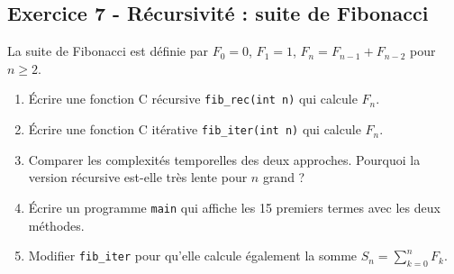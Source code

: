 \documentclass[12pt,a4paper]{article}
\begin{document}
\subsection*{Exercice 7 - Récursivité : suite de Fibonacci \niveau{\moyen}}

\begin{boiteexercice}
La suite de Fibonacci est définie par $F_0=0$, $F_1=1$, $F_n=F_{n-1}+F_{n-2}$ pour $n\geq2$.
\begin{enumerate}
  \item Écrire une fonction C récursive \texttt{fib\_rec(int n)} qui calcule $F_n$.
  \item Écrire une fonction C itérative \texttt{fib\_iter(int n)} qui calcule $F_n$.
  \item Comparer les complexités temporelles des deux approches. Pourquoi la version récursive est-elle très lente pour $n$ grand ?
  \item Écrire un programme \texttt{main} qui affiche les 15 premiers termes avec les deux méthodes.
  \item Modifier \texttt{fib\_iter} pour qu'elle calcule également la somme $S_n = \sum_{k=0}^n F_k$.
\end{enumerate}
\end{boiteexercice}
\end{document}
